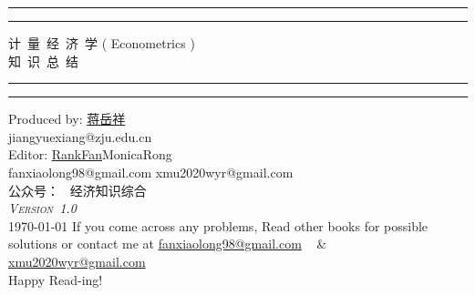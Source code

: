 \documentclass[UTF8]{book}
\begin{document}
		\begin{titlepage}
			\centering %
			\scshape %
			\vspace*{1.5\baselineskip} %

			\rule{15cm}{1.6pt}\vspace*{-\baselineskip}\vspace*{2pt} %
			\rule{15cm}{0.4pt} %
			
				\vspace{0.75\baselineskip} %
			{	\Huge 计~量~经~济~学 ( Econometrics )\\ 
					\vspace{4mm}
				知~识~总~结 \\	}
				\vspace{0.75\baselineskip} %
			\rule{15cm}{0.4pt}\vspace*{-\baselineskip}\vspace{3.2pt} %
			\rule{15cm}{1.6pt} %
			
				\vspace{1.75\baselineskip} %
			{\large Produced by: \href{https://person.zju.edu.cn/0087038}{蒋岳祥} \\
				\vspace*{1.2\baselineskip}
				jiangyuexiang@zju.edu.cn} \\
			    \vspace*{\baselineskip}
			{\large Editor: \href{https://blog.csdn.net/Rank_fxl?spm=1001.2101.3001.5343}{RankFan}\quad  MonicaRong \\
				\vspace*{\baselineskip}
				fanxiaolong98@gmail.com \quad 
				xmu2020wyr@gmail.com\\
				\vspace*{\baselineskip} 
				公众号：~ 经济知识综合\\
				\vspace*{\baselineskip}
			    { \it  \scshape Version~1.0} \\
				\vspace*{\baselineskip}
				\today} 
			\vfill
		If you come across any problems, Read other books for possible\\ \vspace{1mm}
		solutions or contact me at \url{fanxiaolong98@gmail.com} ~ \& ~ \url{xmu2020wyr@gmail.com} \\ \vspace{1mm}
		Happy Read-ing!
		\end{titlepage}
\end{document}
